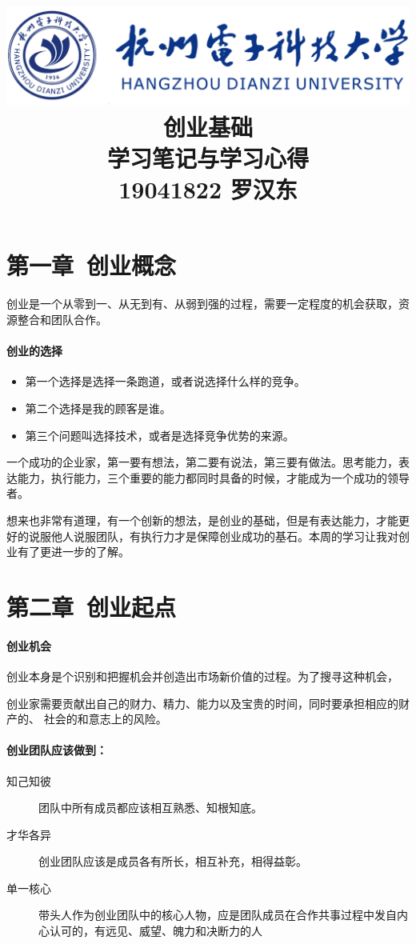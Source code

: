 \documentclass[UTF8]{ctexart}
\title{
	\includegraphics[scale = 1.0]{HDU.png}\\
    \vspace{1in}
    \textmd{ \Huge\textbf{创业基础}}\\
    \textmd{\textbf{学习笔记与学习心得}}\\
   	\vspace{4in}
	\textmd{19041822 罗汉东}\\
}
\begin{document}
\maketitle
\newpage
\tableofcontents
\newpage
\section{第一章\ 创业概念}
创业是一个从零到一、从无到有、从弱到强的过程，需要一定程度的机会获取，资源整合和团队合作。
\paragraph{创业的选择}
\begin{itemize}
    \item 第一个选择是选择一条跑道，或者说选择什么样的竞争。
    \item 第二个选择是我的顾客是谁。
    \item 第三个问题叫选择技术，或者是选择竞争优势的来源。
\end{itemize}
一个成功的企业家，第一要有想法，第二要有说法，第三要有做法。思考能力，表达能力，执行能力，三个重要的能力都同时具备的时候，才能成为一个成功的领导者。


想来也非常有道理，有一个创新的想法，是创业的基础，但是有表达能力，才能更好的说服他人说服团队，有执行力才是保障创业成功的基石。本周的学习让我对创业有了更进一步的了解。


\section{第二章\ 创业起点}
\paragraph{创业机会}
创业本身是个识别和把握机会并创造出市场新价值的过程。为了搜寻这种机会，

创业家需要贡献出自己的财力、精力、能力以及宝贵的时间，同时要承担相应的财产的、
社会的和意志上的风险。
\paragraph{创业团队应该做到：}
\begin{description}
    \item[知己知彼]团队中所有成员都应该相互熟悉、知根知底。
    \item[才华各异]创业团队应该是成员各有所长，相互补充，相得益彰。
    \item[单一核心]带头人作为创业团队中的核心人物，应是团队成员在合作共事过程中发自内心认可的，有远见、威望、魄力和决断力的人
\end{description}
\end{document}
